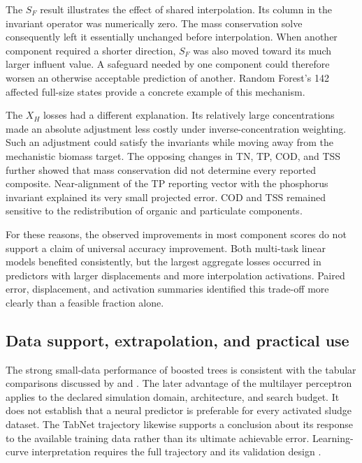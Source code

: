 The $S_F$ result illustrates the effect of shared interpolation. Its column in the invariant operator was numerically zero. The mass conservation solve consequently left it essentially unchanged before interpolation. When another component required a shorter direction, $S_F$ was also moved toward its much larger influent value. A safeguard needed by one component could therefore worsen an otherwise acceptable prediction of another. Random Forest's 142 affected full-size states provide a concrete example of this mechanism.

The $X_H$ losses had a different explanation. Its relatively large concentrations made an absolute adjustment less costly under inverse-concentration weighting. Such an adjustment could satisfy the invariants while moving away from the mechanistic biomass target. The opposing changes in TN, TP, COD, and TSS further showed that mass conservation did not determine every reported composite. Near-alignment of the TP reporting vector with the phosphorus invariant explained its very small projected error. COD and TSS remained sensitive to the redistribution of organic and particulate components.

For these reasons, the observed improvements in most component scores do not support a claim of universal accuracy improvement. Both multi-task linear models benefited consistently, but the largest aggregate losses occurred in predictors with larger displacements and more interpolation activations. Paired error, displacement, and activation summaries identified this trade-off more clearly than a feasible fraction alone.

\subsection{Data support, extrapolation, and practical use}

The strong small-data performance of boosted trees is consistent with the tabular comparisons discussed by \citet{Borisov2024} and \citet{ShwartzZiv2022}. The later advantage of the multilayer perceptron applies to the declared simulation domain, architecture, and search budget. It does not establish that a neural predictor is preferable for every activated sludge dataset. The TabNet trajectory likewise supports a conclusion about its response to the available training data rather than its ultimate achievable error. Learning-curve interpretation requires the full trajectory and its validation design \citep{VieringLoog2023}.

